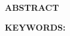 
\pagestyle{artimain}

\begin{center}
\textbf{ \titlethesisENG}
\\[2em]
\textbf{ ABSTRACT}
\end{center}

\vspace{2em} 
\vspace{2em}\par\textbf{ KEYWORDS: }
